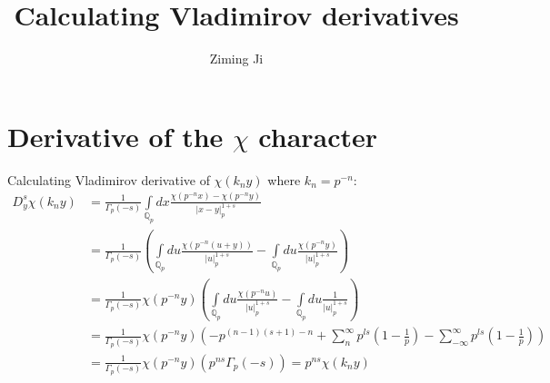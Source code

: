 \documentclass[12pt]{article}
\begin{document}
 
\title{Calculating Vladimirov derivatives}
\author{Ziming Ji}
 
\maketitle
 
\section{Derivative of the $\chi$ character}
Calculating Vladimirov derivative of $\chi(k_ny)$ where $k_n=p^{-n}$:
\begin{equation}
\begin{aligned}
D^s_y \chi(k_n y)&=\frac{1}{\Gamma_p (-s)} \int\limits _{\mathbb{Q}_p}dx \frac{\chi( p^{-n} x) - \chi( p^{-n}y)}{|x-y|_p^{1+s}}\\
&=\frac{1}{\Gamma_p (-s)} \left(\int\limits _{\mathbb{Q}_p}du \frac{\chi( p^{-n} (u+y))}{|u|_p^{1+s}}-\int\limits _{\mathbb{Q}_p}du \frac{\chi( p^{-n} y)}{|u|_p^{1+s}}\right)\\
&=\frac{1}{\Gamma_p (-s)} \chi( p^{-n} y)\left(\int\limits _{\mathbb{Q}_p}du \frac{\chi( p^{-n} u)}{|u|_p^{1+s}}-\int\limits _{\mathbb{Q}_p}du \frac{1}{|u|_p^{1+s}}\right)\\
&=\frac{1}{\Gamma_p (-s)} \chi( p^{-n} y)\left(-p^{(n-1)(s+1)-n}+\sum\limits_n^\infty p^{ls}(1-\frac{1}{p})-\sum\limits_{-\infty}^\infty p^{ls}(1-\frac{1}{p})\right)\\
&=\frac{1}{\Gamma_p (-s)} \chi( p^{-n} y)\left(p^{ns}\Gamma_p(-s)\right)=p^{ns}\chi(k_n y)
\end{aligned}
\end{equation}
\end{document}
